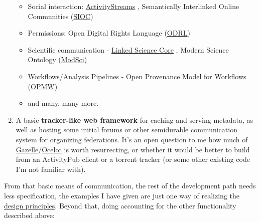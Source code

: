 \documentclass[10pt]{article}
\begin{document}
\begin{multicols}{2}
\begin{enumerate}
  \begin{itemize}
  
  \item
    Social interaction:
    \href{https://www.w3.org/TR/activitystreams-vocabulary/}{ActivityStreams}
    \cite{snellActivityStreams2017} , Semantically Interlinked
    Online Communities (\href{http://sioc-project.org/}{SIOC}) \cite{harthLinkingSemanticallyEnabled2004} 
  \item
    Permissions: Open Digital Rights Language
    (\href{https://www.w3.org/ns/odrl/2/}{ODRL})
  \item
    Scientific communication -
    \href{http://linkedscience.org/lsc/ns/}{Linked Science Core} \cite{kauppinenLinkedOpenScienceCommunicating2011} , Modern
    Science Ontology
    (\href{https://saidfathalla.github.io/Science-knowledge-graph-ontologies/doc/ModSci_doc/index-en.html\#dataproperties-headline}{ModSci})
  \item
    Workflows/Analysis Pipelines - Open Provenance Model for Workflows
    (\href{https://www.opmw.org/model/OPMW/}{OPMW})
  \item
    and many, many more.
  \end{itemize}
\item
  A basic \textbf{tracker-like web framework} for caching and serving
  metadata, as well as hosting some initial forums or other semidurable
  communication system for organizing federations. It's an open question
  to me how much of
  \href{https://github.com/WhatCD/Gazelle}{Gazelle}/\href{https://github.com/WhatCD/Ocelot}{Ocelot}
  is worth resurrecting, or whether it would be better to build from an
  ActivityPub client or a torrent tracker (or some other existing code
  I'm not familiar with).
\end{enumerate}

From that basic means of communication, the rest of the development path
needs less specification, the examples I have given are just one way of
realizing the \protect\hyperlink{design-principles}{design principles}.
Beyond that, doing accounting for the other functionality described
above:

\begin{itemize}


\end{itemize}
\end{multicols}
\end{document}
